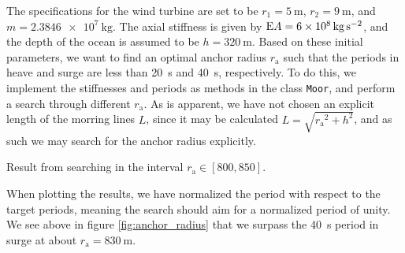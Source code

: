 The specifications for the wind turbine are set to be $r_1 = \SI{5}{\meter}$, $r_2 = \SI{9}{\meter}$, and $m = \SI{2.3846e7}{\kilo\gram}$.
The axial stiffness is given by $\mathrm{E} A = \SI{6e8}{\kilo\gram\per\second\squared}$, and the depth of the ocean is assumed to be $h = \SI{320}{\meter}$.
Based on these initial parameters, we want to find an optimal anchor radius $r_{\mathrm{a}}$ such that the periods in heave and surge are less than \SI{20}{\second} and \SI{40}{\second}, respectively.
To do this, we implement the stiffnesses and periods as methods in the class \texttt{Moor}, and perform a search through different $r_{\mathrm{a}}$.
As is apparent, we have not chosen an explicit length of the morring lines $L$, since it may be calculated $L = \sqrt{{r_{\mathrm{a}}}^2 + h^2}$, and as such we may search for the anchor radius explicitly.
\begin{Figure}
        \centering
        \captionsetup{type = figure}
        \scalebox{.45}{}
        \caption{Result from searching in the interval $r_{\mathrm{a}}\in[800,850]$.}
        \label{fig:anchor_radius}
\end{Figure}
When plotting the results, we have normalized the period with respect to the target periods, meaning the search should aim for a normalized period of unity.
We see above in figure \ref{fig:anchor_radius} that we surpass the \SI{40}{\second} period in surge at about $r_{\mathrm{a}} = \SI{830}{\meter}$.
